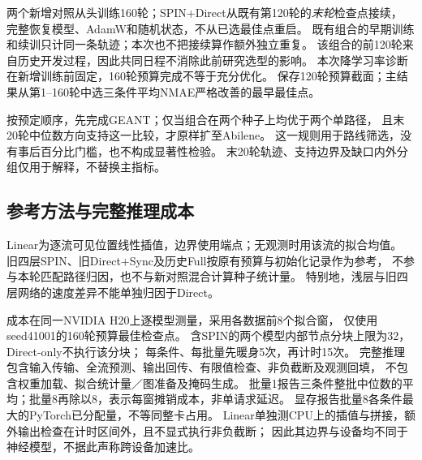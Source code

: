 两个新增对照从头训练160轮；SPIN+Direct从既有第120轮的\emph{末轮}检查点接续，
完整恢复模型、AdamW和随机状态，不从已选最佳点重启。
既有组合的早期训练和续训只计同一条轨迹；本次也不把接续算作额外独立重复。
该组合的前120轮来自历史开发过程，因此共同日程不消除此前研究选型的影响。
本次降学习率诊断在新增训练前固定，160轮预算完成不等于充分优化。
保存120轮预算截面；主结果从第1--160轮中选三条件平均NMAE严格改善的最早最佳点。

按预定顺序，先完成GEANT；仅当组合在两个种子上均优于两个单路径，
且末20轮中位数方向支持这一比较，才原样扩至Abilene。
这一规则用于路线筛选，没有事后百分比门槛，也不构成显著性检验。
末20轮轨迹、支持边界及缺口内外分组仅用于解释，不替换主指标。

\subsection{参考方法与完整推理成本}
Linear为逐流可见位置线性插值，边界使用端点；无观测时用该流的拟合均值。
旧四层SPIN、旧Direct+Sync及历史Full按原有预算与初始化记录作为参考，
不参与本轮匹配路径归因，也不与新对照混合计算种子统计量。
特别地，浅层与旧四层网络的速度差异不能单独归因于Direct。

成本在同一NVIDIA H20上逐模型测量，采用各数据前8个拟合窗，
仅使用seed41001的160轮预算最佳检查点。
含SPIN的两个模型内部节点分块上限为32，Direct-only不执行该分块；
每条件、每批量先暖身5次，再计时15次。
完整推理包含输入传输、全流预测、输出回传、有限值检查、非负截断及观测回填，
不包含权重加载、拟合统计量／图准备及掩码生成。
批量1报告三条件整批中位数的平均；批量8再除以8，表示每窗摊销成本，非单请求延迟。
显存报告批量8各条件最大的PyTorch已分配量，不等同整卡占用。
Linear单独测CPU上的插值与拼接，额外输出检查在计时区间外，且不显式执行非负截断；
因此其边界与设备均不同于神经模型，不据此声称跨设备加速比。
